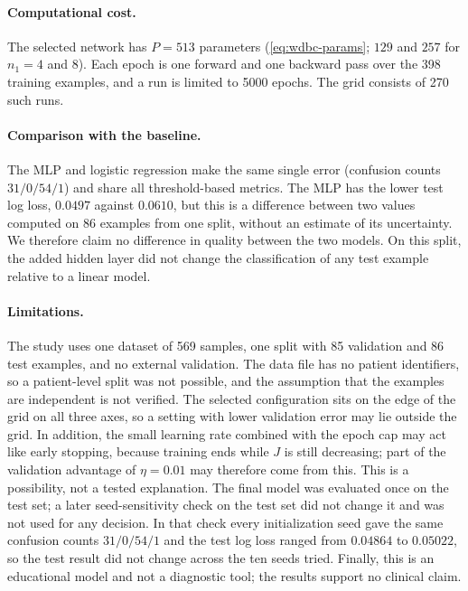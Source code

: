 \paragraph{Computational cost.}
The selected network has $P=513$ parameters (\eqref{eq:wdbc-params}; $129$ and $257$ for $n_1=4$ and $8$). Each epoch is one forward and one backward pass over the 398 training examples, and a run is limited to 5000 epochs. The grid consists of 270 such runs.

\paragraph{Comparison with the baseline.}
The MLP and logistic regression make the same single error (confusion counts $31/0/54/1$) and share all threshold-based metrics. The MLP has the lower test log loss, $0.0497$ against $0.0610$, but this is a difference between two values computed on 86 examples from one split, without an estimate of its uncertainty. We therefore claim no difference in quality between the two models. On this split, the added hidden layer did not change the classification of any test example relative to a linear model.

\paragraph{Limitations.}
The study uses one dataset of 569 samples, one split with 85 validation and 86 test examples, and no external validation. The data file has no patient identifiers, so a patient-level split was not possible, and the assumption that the examples are independent is not verified. The selected configuration sits on the edge of the grid on all three axes, so a setting with lower validation error may lie outside the grid. In addition, the small learning rate combined with the epoch cap may act like early stopping, because training ends while $J$ is still decreasing; part of the validation advantage of $\eta=0.01$ may therefore come from this. This is a possibility, not a tested explanation. The final model was evaluated once on the test set; a later seed-sensitivity check on the test set did not change it and was not used for any decision. In that check every initialization seed gave the same confusion counts $31/0/54/1$ and the test log loss ranged from $0.04864$ to $0.05022$, so the test result did not change across the ten seeds tried. Finally, this is an educational model and not a diagnostic tool; the results support no clinical claim.
